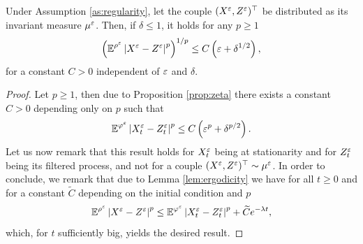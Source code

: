 \documentclass[10pt]{article}
\begin{document}
\begin{appendices}
\begin{corollary} \label{cor:distanceZandX} Under Assumption \ref{as:regularity}, let the couple $(X^\varepsilon, Z^\varepsilon)^\top$ be distributed as its invariant measure $\mu^\varepsilon$. Then, if $\delta \leq 1$, it holds for any $p \geq 1$
	\begin{equation}
	\left(\operatorname{\mathbb{E}}^{\rho^\varepsilon} \left\lvert X^\varepsilon - Z^\varepsilon\right\rvert^p\right)^{1/p} \leq C\left(\varepsilon + \delta^{1/2}\right),
	\end{equation}
	for a constant $C > 0$ independent of $\varepsilon$ and $\delta$.
\end{corollary}
\begin{proof}
	Let $p \geq 1$, then due to Proposition \ref{prop:zeta} there exists a constant $C > 0$ depending only on $p$ such that
	\begin{equation}
	\operatorname{\mathbb{E}}^{\varphi^\varepsilon}\left\lvert X_t^\varepsilon - Z_t^\varepsilon\right\rvert^p \leq C\left(\varepsilon^p + \delta^{p/2}\right).
	\end{equation}
	Let us now remark that this result holds for $X_t^\varepsilon$ being at stationarity and for $Z_t^\varepsilon$ being its filtered process, and not for a couple $(X^\varepsilon, Z^\varepsilon)^\top \sim \mu^\varepsilon$. In order to conclude, we remark that due to Lemma \ref{lem:ergodicity} we have for all $t \geq 0$ and for a constant $\widetilde C$ depending on the initial condition and $p$  
	\begin{equation}
	\operatorname{\mathbb{E}}^{\rho^\varepsilon} \left\lvert X^\varepsilon - Z^\varepsilon\right\rvert^p \leq \operatorname{\mathbb{E}}^{\varphi^\varepsilon}\left\lvert X_t^\varepsilon - Z_t^\varepsilon\right\rvert^p + \widetilde Ce^{-\lambda t},
	\end{equation}
	which, for $t$ sufficiently big, yields the desired result.
\end{proof}


\end{appendices}
\end{document}
